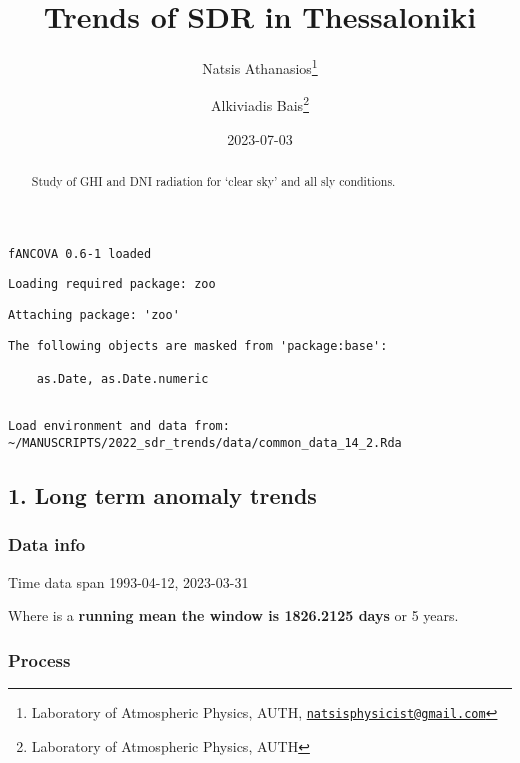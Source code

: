 \documentclass[
  10pt,
  a4paper,oneside]{article}
\title{Trends of SDR in Thessaloniki}
\author{Natsis Athanasios\footnote{Laboratory of Atmospheric Physics, AUTH, \href{mailto:natsisphysicist@gmail.com}{\nolinkurl{natsisphysicist@gmail.com}}} \and Alkiviadis Bais\footnote{Laboratory of Atmospheric Physics, AUTH}}
\date{2023-07-03}
\begin{document}
\maketitle
\begin{abstract}
Study of GHI and DNI radiation for `clear sky' and all sly conditions.
\end{abstract}

{
\hypersetup{linkcolor=}
\setcounter{tocdepth}{4}
\tableofcontents
}
\begin{verbatim}
fANCOVA 0.6-1 loaded
\end{verbatim}

\begin{verbatim}
Loading required package: zoo
\end{verbatim}

\begin{verbatim}
Attaching package: 'zoo'
\end{verbatim}

\begin{verbatim}
The following objects are masked from 'package:base':

    as.Date, as.Date.numeric
\end{verbatim}

\begin{verbatim}

Load environment and data from:  ~/MANUSCRIPTS/2022_sdr_trends/data/common_data_14_2.Rda 
\end{verbatim}

\hypertarget{long-term-anomaly-trends}{%
\subsection{1. Long term anomaly trends}\label{long-term-anomaly-trends}}

\hypertarget{data-info}{%
\subsubsection{Data info}\label{data-info}}

Time data span 1993-04-12, 2023-03-31

Where is a \textbf{running mean the window is 1826.2125 days} or
5 years.

\hypertarget{process}{%
\subsubsection{Process}\label{process}}
\end{document}

